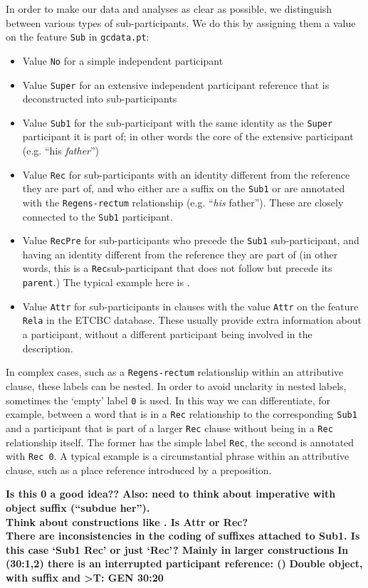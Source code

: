 \documentclass{report}
\newcommand{\mi}[1]{\lstinline{#1}}
\newcommand{\hebr}[1]{\cjRL{#1}}
\begin{document}
In order to make our data and analyses as clear as possible, we distinguish between various types of sub-participants. We do this by assigning them a value on the feature \mi{Sub} in \mi{gcdata.pt}:
\begin{itemize}
\item Value \mi{No} for a simple independent participant
\item Value \mi{Super} for an extensive independent participant reference that is deconstructed into sub-participants
\item Value \mi{Sub1} for the sub-participant with the same identity as the \mi{Super} participant it is part of; in other words the core of the extensive participant (e.g. ``his \emph{father}'')
\item Value \mi{Rec} for sub-participants with an identity different from the reference they are part of, and who either are a suffix on the \mi{Sub1} or are annotated with the \mi{Regens-rectum} relationship (e.g. ``\emph{his} father''). These are closely connected to the \mi{Sub1} participant.
\item Value \mi{RecPre} for sub-participants who precede the \mi{Sub1} sub-participant, and having an identity different from the reference they are part of (in other words, this is a \mi{Rec}sub-participant that does not follow but precede its \mi{parent}.) The typical example here is \hebr{KL}.
\item Value \mi{Attr} for sub-participants in clauses with the value \mi{Attr} on the feature \mi{Rela} in the ETCBC database. These usually provide extra information about a participant, without a different participant being involved in the description.
\end{itemize}

In complex cases, such as a \mi{Regens-rectum} relationship within an attributive clause, these labels can be nested.
In order to avoid unclarity in nested labels, sometimes the `empty' label \mi{0} is used. In this way we can differentiate, for example, between a word that is in a \mi{Rec} relationship to the corresponding \mi{Sub1} and a participant that is part of a larger \mi{Rec} clause without being in a \mi{Rec} relationship itself. The former has the simple label \mi{Rec}, the second is annotated with \mi{Rec 0}. A typical example is a circumstantial phrase within an attributive clause, such as a place reference introduced by a preposition.

\textbf{Is this 0 a good idea?? Also: need to think about imperative with object suffix (``subdue her'').} \\
\textbf{Think about constructions like \hebr{>RY KN<N}. Is \hebr{KN<N} Attr or Rec?} \\
\textbf{There are inconsistencies in the coding of suffixes attached to Sub1. Is this case `Sub1 Rec' or just `Rec'? Mainly in larger constructions}
\textbf{In (30:1,2) there is an interrupted participant reference: \hebr{TXT >LHJM} (\hebr{>NKJ}) \hebr{>CR MN< MMK PRJ BVN}}
\textbf{Double object, with suffix and >T: GEN 30:20}
\end{document}
